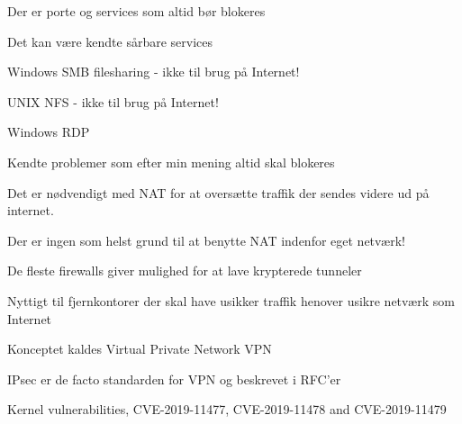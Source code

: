 \documentclass[Screen16to9,17pt]{foils}
\begin{document}

\begin{list1}
\item Der er porte og services som altid bør blokeres
\item Det kan være kendte sårbare services
\begin{list2}
\item Windows SMB filesharing - ikke til brug på Internet!
\item UNIX NFS - ikke til brug på Internet!
\item Windows RDP
\end{list2}
\item Kendte problemer som efter min mening altid skal blokeres
\end{list1}




\begin{list1}
\item Det er nødvendigt med NAT for at oversætte traffik der sendes videre
ud på internet.
\vskip 1cm
\item Der er ingen som helst grund til at benytte NAT indenfor eget netværk!
\end{list1}



\begin{list1}
\item De fleste firewalls giver mulighed for at lave krypterede
  tunneler
\item Nyttigt til fjernkontorer der skal have usikker traffik henover
  usikre netværk som Internet
\item Konceptet kaldes Virtual Private Network VPN
\item IPsec er de facto standarden for VPN og beskrevet i RFC'er
\end{list1}



Kernel vulnerabilities, CVE-2019-11477, CVE-2019-11478 and CVE-2019-11479
\end{document}

